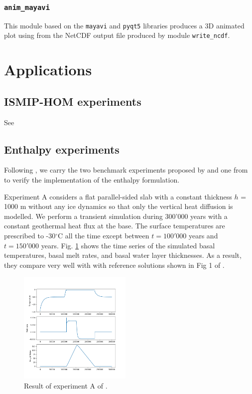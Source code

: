 \documentclass[10pt,twocolumn]{article}
\begin{document}
\subsubsection{\texttt{anim\_mayavi}}
\label{module_mayavi}

This module based on the \texttt{mayavi} and \texttt{pyqt5} libraries
produces a 3D animated plot using from the 
NetCDF output file produced by module \texttt{write\_ncdf}.


\section{Applications} 

\subsection{ISMIP-HOM experiments}

See \citep{jouvet2023ice}

\subsection{Enthalpy experiments}

Following \citep{wang2020two}, we carry the two benchmark experiments proposed by 
\citep{kleiner2015enthalpy} and one from \citep{hewitt2017models} to
verify the implementation of the enthalpy formulation.

Experiment A considers a flat parallel-sided slab with a constant thickness $h$ = 1000 m
without any ice dynamics so that only the vertical heat diffusion is modelled. We perform
a transient simulation during 300'000 years with a constant geothermal heat flux at the base. 
The surface temperatures are prescribed to -30$^{\circ}$C all the time except between
$t=100'000$ years and $t=150'000$ years. Fig. \ref{KleinerExpA} 
shows the time series of the simulated basal temperatures,
basal melt rates, and basal water layer thicknesses. As a result, they compare very well with 
with reference solutions shown in Fig 1 of \citep{kleiner2015enthalpy}. 

\begin{figure}[!h]
\begin{center} 
\includegraphics[width=0.48\textwidth]{fig/KleinerExpA.png}   
\end{center}
\caption{ Result of experiment A of \citep{kleiner2015enthalpy}. \label{KleinerExpA}}
\end{figure}
\end{document}

